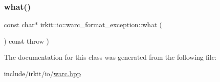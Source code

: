 \mbox{\label{classirkit_1_1io_1_1warc__format__exception_a2571f83ce38f5b6765e008fd643f38c5}} 
\subsubsection{\texorpdfstring{what()}{what()}}
{\footnotesize\ttfamily const char$\ast$ irkit\+::io\+::warc\+\_\+format\+\_\+exception\+::what (\begin{DoxyParamCaption}{ }\end{DoxyParamCaption}) const throw  ) \hspace{0.3cm}{\ttfamily [inline]}}



The documentation for this class was generated from the following file\+:\begin{DoxyCompactItemize}
\item 
include/irkit/io/\mbox{\hyperlink{warc_8hpp}{warc.\+hpp}}\end{DoxyCompactItemize}
